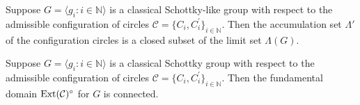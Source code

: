 \documentclass[10pt,a4paper]{amsart}
\DeclareMathOperator{\Ext}{\rm Ext}
\begin{document}
\begin{lem} \label{lem: basics2}  Suppose 
  $G =\langle g_i :i \in \mathbb N\rangle$ is a classical Schottky-like group with respect to 
  the admissible configuration of circles $\mathcal{C}=\{C_i ,C_i ^{\prime}\}_{i \in \mathbb N}$. Then
  the accumulation set $\Lambda'$ of the configuration circles is a closed subset of the limit set $\Lambda(G)$.
  \end{lem}

\begin{prop} \label{prop: basics1}  Suppose 
  $G =\langle g_i :i \in \mathbb N\rangle$ is a classical Schottky group with respect to 
  the admissible configuration of  circles $\mathcal{C}=\{C_i ,C_i ^{\prime}\}_{i \in \mathbb N}$. Then the fundamental domain $\Ext (\mathcal{C})^{\circ}$ for $G$ is connected.
\end{prop}
\end{document}
